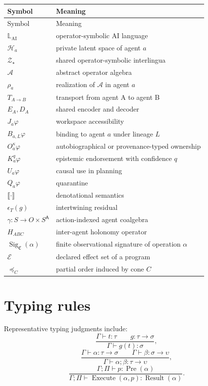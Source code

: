 \documentclass[11pt]{article}
\theoremstyle{definition}
\theoremstyle{remark}
\newcommand{\LangAI}{\mathbb L_{\mathrm{AI}}}
\newcommand{\Lat}{\mathcal H}
\newcommand{\Shared}{\mathcal Z_\star}
\newcommand{\Sem}[1]{\llbracket #1\rrbracket}
\newcommand{\Sig}{\operatorname{Sig}}
\begin{document}
\begin{longtable}{p{}p{}}
\toprule
Symbol & Meaning \\
\midrule
\endfirsthead
\toprule
Symbol & Meaning \\
\midrule
\endhead
\(\LangAI\) & operator-symbolic AI language \\
\(\Lat_a\) & private latent space of agent \(a\) \\
\(\Shared\) & shared operator-symbolic interlingua \\
\(\mathcal A\) & abstract operator algebra \\
\(\rho_a\) & realization of \(\mathcal A\) in agent \(a\) \\
\(T_{A\to B}\) & transport from agent A to agent B \\
\(E_A,D_A\) & shared encoder and decoder \\
\(J_a\varphi\) & workspace accessibility \\
\(B_{a,L}\varphi\) & binding to agent \(a\) under lineage \(L\) \\
\(O_a^\kappa\varphi\) & autobiographical or provenance-typed ownership \\
\(K_a^q\varphi\) & epistemic endorsement with confidence \(q\) \\
\(U_a\varphi\) & causal use in planning \\
\(Q_a\varphi\) & quarantine \\
\(\Sem{\cdot}\) & denotational semantics \\
\(\epsilon_T(g)\) & intertwining residual \\
\(\gamma:S\to O\times S^{\mathsf A}\) & action-indexed agent coalgebra \\
\(H_{ABC}\) & inter-agent holonomy operator \\
\(\Sig_{\mathfrak C}(\alpha)\) & finite observational signature of operation \(\alpha\) \\
\(\mathcal E\) & declared effect set of a program \\
\(\preceq_C\) & partial order induced by cone \(C\) \\
\bottomrule
\end{longtable}

\section{Typing rules}

Representative typing judgments include:
\[
\frac{\Gamma\vdash t:\tau\qquad g:\tau\to\sigma}
{\Gamma\vdash g(t):\sigma},
\]
\[
\frac{\Gamma\vdash\alpha:\tau\to\sigma\qquad\Gamma\vdash\beta:\sigma\to\upsilon}
{\Gamma\vdash\alpha;\beta:\tau\to\upsilon},
\]
\[
\frac{\Gamma;\Pi\vdash p:\operatorname{Pre}(\alpha)}
{\Gamma;\Pi\vdash\operatorname{Execute}(\alpha,p):\operatorname{Result}(\alpha)}.
\]
\end{document}
